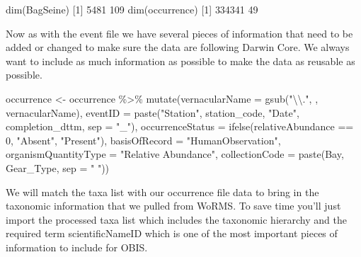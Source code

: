 \documentclass[
]{book}
\newenvironment{Shaded}{\begin{snugshade}}{\end{snugshade}}
\newcommand{\AttributeTok}[1]{\textcolor[rgb]{0.77,0.63,0.00}{#1}}
\newcommand{\DecValTok}[1]{\textcolor[rgb]{0.00,0.00,0.81}{#1}}
\newcommand{\FunctionTok}[1]{\textcolor[rgb]{0.00,0.00,0.00}{#1}}
\newcommand{\NormalTok}[1]{#1}
\newcommand{\OtherTok}[1]{\textcolor[rgb]{0.56,0.35,0.01}{#1}}
\newcommand{\SpecialCharTok}[1]{\textcolor[rgb]{0.00,0.00,0.00}{#1}}
\newcommand{\StringTok}[1]{\textcolor[rgb]{0.31,0.60,0.02}{#1}}
\begin{document}
\begin{Shaded}
\begin{Highlighting}[]
\FunctionTok{dim}\NormalTok{(BagSeine)}
\NormalTok{[}\DecValTok{1}\NormalTok{] }\DecValTok{5481}  \DecValTok{109}
\FunctionTok{dim}\NormalTok{(occurrence)}
\NormalTok{[}\DecValTok{1}\NormalTok{] }\DecValTok{334341}     \DecValTok{49}
\end{Highlighting}
\end{Shaded}

Now as with the event file we have several pieces of information that need to be added or changed to make sure the data are following Darwin Core. We always want to include as much information as possible to make the data as reusable as possible.

\begin{Shaded}
\begin{Highlighting}[]
\NormalTok{occurrence }\OtherTok{\textless{}{-}}\NormalTok{ occurrence }\SpecialCharTok{\%\textgreater{}\%}
  \FunctionTok{mutate}\NormalTok{(}\AttributeTok{vernacularName =} \FunctionTok{gsub}\NormalTok{(}\StringTok{"}\SpecialCharTok{\textbackslash{}\textbackslash{}}\StringTok{."}\NormalTok{,}\StringTok{\textquotesingle{} \textquotesingle{}}\NormalTok{, vernacularName),}
         \AttributeTok{eventID =} \FunctionTok{paste}\NormalTok{(}\StringTok{"Station"}\NormalTok{, station\_code, }\StringTok{"Date"}\NormalTok{, completion\_dttm, }\AttributeTok{sep =} \StringTok{"\_"}\NormalTok{),}
         \AttributeTok{occurrenceStatus =} \FunctionTok{ifelse}\NormalTok{(relativeAbundance }\SpecialCharTok{==} \DecValTok{0}\NormalTok{, }\StringTok{"Absent"}\NormalTok{, }\StringTok{"Present"}\NormalTok{),}
         \AttributeTok{basisOfRecord =} \StringTok{"HumanObservation"}\NormalTok{,}
         \AttributeTok{organismQuantityType =} \StringTok{"Relative Abundance"}\NormalTok{,}
         \AttributeTok{collectionCode =} \FunctionTok{paste}\NormalTok{(Bay, Gear\_Type, }\AttributeTok{sep =} \StringTok{" "}\NormalTok{))}
\end{Highlighting}
\end{Shaded}

We will match the taxa list with our occurrence file data to bring in the taxonomic information that we pulled from WoRMS. To save time you'll just import the processed taxa list which includes the taxonomic hierarchy and the required term scientificNameID which is one of the most important pieces of information to include for OBIS.
\end{document}
